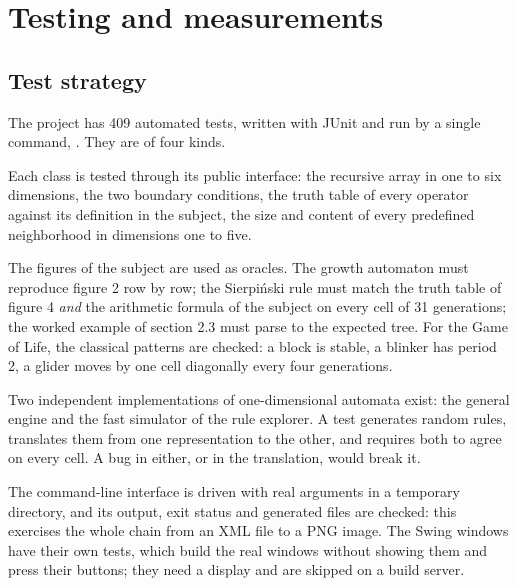 \section{Testing and measurements}
\label{sec:quality}

\subsection{Test strategy}

The project has 409 automated tests, written with JUnit and run by a single command,
. They are of four kinds.

\begin{description}[leftmargin=1.2em,style=nextline]
    \item[Unit tests of the model.] Each class is tested through its public interface: the
          recursive array in one to six dimensions, the two boundary conditions, the truth table of
          every operator against its definition in the subject, the size and content of every
          predefined neighborhood in dimensions one to five.
    \item[Tests against the subject.] The figures of the subject are used as oracles. The growth
          automaton must reproduce figure 2 row by row; the Sierpi\'nski rule must match the truth table
          of figure 4 \emph{and} the arithmetic formula of the subject on every cell of 31 generations;
          the worked example of section 2.3 must parse to the expected tree. For the Game of Life, the
          classical patterns are checked: a block is stable, a blinker has period 2, a glider moves by
          one cell diagonally every four generations.
    \item[Cross-validation.] Two independent implementations of one-dimensional automata exist: the
          general engine and the fast simulator of the rule explorer. A test generates random rules,
          translates them from one representation to the other, and requires both to agree on every
          cell. A bug in either, or in the translation, would break it.
    \item[End-to-end tests.] The command-line interface is driven with real arguments in a
          temporary directory, and its output, exit status and generated files are checked: this
          exercises the whole chain from an XML file to a PNG image. The Swing windows have their own
          tests, which build the real windows without showing them and press their buttons; they need
          a display and are skipped on a build server.
\end{description}

